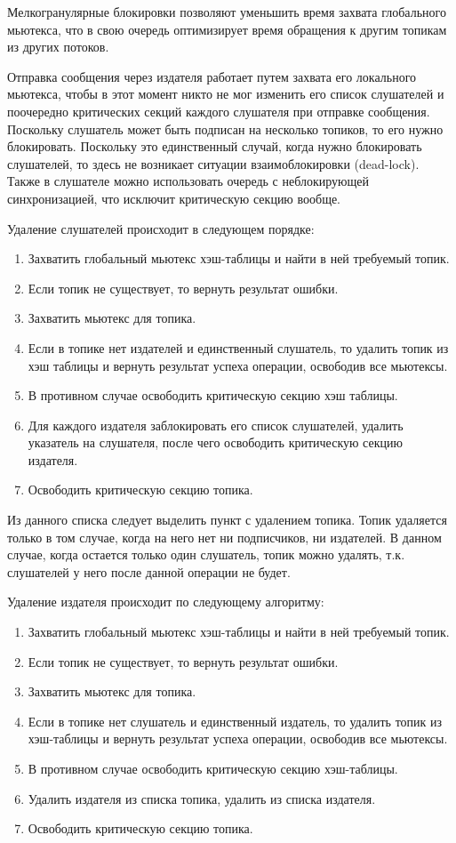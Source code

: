 Мелкогранулярные блокировки позволяют уменьшить время захвата глобального мьютекса, что в свою очередь оптимизирует время обращения к другим топикам из других потоков.

Отправка сообщения через издателя работает путем захвата его локального 
мьютекса, чтобы в этот момент никто не мог изменить его список слушателей и 
поочередно критических секций каждого слушателя при отправке сообщения. 
Поскольку слушатель может быть подписан на несколько топиков, то его нужно 
блокировать. Поскольку это единственный случай, когда нужно блокировать 
слушателей, то здесь не возникает ситуации взаимоблокировки (dead-lock). Также 
в слушателе можно использовать очередь с неблокирующей синхронизацией, что 
исключит критическую секцию вообще.

Удаление слушателей происходит в следующем порядке:

\begin{enumerate}
	\item Захватить глобальный мьютекс хэш-таблицы и найти в ней требуемый топик.
	\item Если топик не существует, то вернуть результат ошибки.
	\item Захватить мьютекс для топика.
	\item Если в топике нет издателей и единственный слушатель, то удалить топик из хэш таблицы и вернуть результат успеха операции, освободив все мьютексы.
	\item В противном случае освободить критическую секцию хэш таблицы.
	\item Для каждого издателя заблокировать его список слушателей, удалить указатель на слушателя, после чего освободить критическую секцию издателя.
	\item Освободить критическую секцию топика.
\end{enumerate}

Из данного списка следует выделить пункт с удалением топика. Топик удаляется только в том случае, когда на него нет ни подписчиков, ни издателей. В данном случае, когда остается только один слушатель, топик можно удалять, т.к. слушателей у него после данной операции не будет.

Удаление издателя происходит по следующему алгоритму:

\begin{enumerate}
	\item Захватить глобальный мьютекс хэш-таблицы и найти в ней требуемый топик.
	\item Если топик не существует, то вернуть результат ошибки.
	\item Захватить мьютекс для топика.
	\item Если в топике нет слушатель и единственный издатель, то удалить топик из хэш-таблицы и вернуть результат успеха операции, освободив все мьютексы.
	\item В противном случае освободить критическую секцию хэш-таблицы.
	\item Удалить издателя из списка топика, удалить из списка издателя.
	\item Освободить критическую секцию топика.
\end{enumerate}

